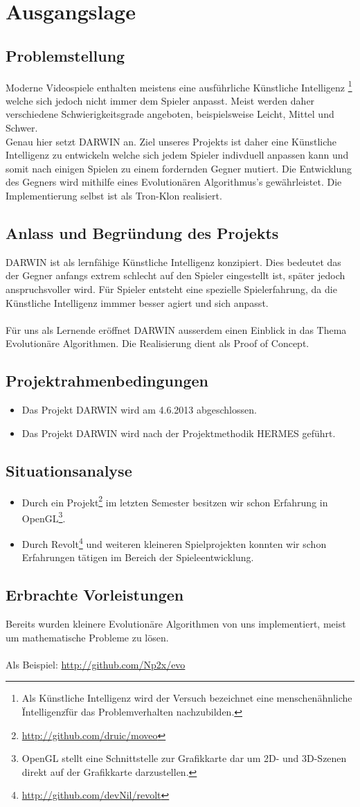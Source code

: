 \section{Ausgangslage}
\subsection{Problemstellung}
Moderne Videospiele enthalten meistens eine ausführliche Künstliche Intelligenz
\footnote{Als Künstliche Intelligenz wird der Versuch bezeichnet eine menschenähnliche \"Intelligenz\" für das Problemverhalten nachzubilden.} welche sich jedoch nicht immer dem Spieler anpasst. Meist werden daher verschiedene Schwierigkeitsgrade angeboten, beispielsweise Leicht, Mittel und Schwer.\\
Genau hier setzt DARWIN an. Ziel unseres Projekts ist daher eine Künstliche Intelligenz zu entwickeln welche sich jedem Spieler indivduell anpassen kann und somit nach einigen Spielen zu einem fordernden Gegner mutiert. Die Entwicklung des Gegners wird mithilfe eines Evolutionären Algorithmus's gewährleistet. Die Implementierung selbst ist als Tron-Klon realisiert.
\subsection{Anlass und Begründung des Projekts}
DARWIN ist als lernfähige Künstliche Intelligenz konzipiert. Dies bedeutet das der Gegner anfangs extrem schlecht auf den Spieler eingestellt ist, später jedoch anspruchsvoller wird. Für Spieler entsteht eine spezielle Spielerfahrung, da die Künstliche Intelligenz immmer besser agiert und sich anpasst. \\\\Für uns als Lernende eröffnet DARWIN ausserdem einen Einblick in das Thema Evolutionäre Algorithmen. Die Realisierung dient als Proof of Concept.
\subsection{Projektrahmenbedingungen}
\begin{itemize}
	\item Das Projekt DARWIN wird am 4.6.2013 abgeschlossen.
	\item Das Projekt DARWIN wird nach der Projektmethodik HERMES geführt.
\end{itemize}
\subsection{Situationsanalyse}
\begin{itemize}
	\item Durch ein Projekt\footnote{\url{http://github.com/druic/moveo}} im letzten Semester besitzen wir schon Erfahrung in
	OpenGL\footnote{OpenGL stellt eine Schnittstelle zur Grafikkarte dar um 2D- und 3D-Szenen direkt auf der Grafikkarte darzustellen.}.
	\item Durch Revolt\footnote{\url{http://github.com/devNil/revolt}} und weiteren kleineren Spielprojekten konnten wir schon Erfahrungen
	tätigen im Bereich der Spieleentwicklung.
\end{itemize}
\subsection{Erbrachte Vorleistungen}
Bereits wurden kleinere Evolutionäre Algorithmen von uns implementiert, meist um mathematische Probleme zu lösen.
\\\\ Als Beispiel: \url{http://github.com/Np2x/evo}